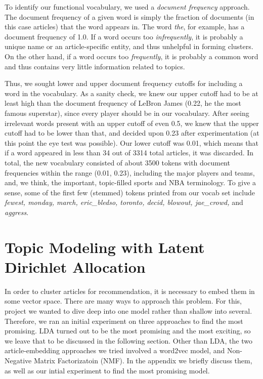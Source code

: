 \documentclass[11pt]{article}
\begin{document}
To identify our functional vocabulary, we used a \textit{document frequency} approach. The document frequency of a given word is simply the fraction of documents (in this case articles) that the word appears in. The word \textit{the}, for example, has a document frequency of 1.0. If a word occurs too \textit{infrequently}, it is probably a unique name or an article-specific entity, and thus unhelpful in forming clusters. On the other hand, if a word occurs too \textit{frequently}, it is probably a common word and thus contains very little information related to topics.

Thus, we sought lower and upper document frequency cutoffs for including a word in the vocabulary.  As a sanity check, we knew our upper cutoff had to be at least high than the document frequency of LeBron James (0.22, he the most famous superstar), since every player should be in our vocabulary. After seeing irrelevant words present with an upper cutoff of even 0.5, we knew that the upper cutoff had to be lower than that, and decided upon 0.23 after experimentation (at this point the eye test was possible). Our lower cutoff was 0.01, which means that if a word appeared in less than 34 out of 3314 total articles, it was discarded.  In total, the new vocabulary consisted of about 3500 tokens with document frequencies within the range (0.01, 0.23), including the major players and teams, and, we think, the important, topic-filled sports and NBA terminology. To give a sense, some of the first few (stemmed) tokens printed from our vocab set include \textit{fewest, monday, march, eric\_bledso, toronto, decid, blowout, jae\_crowd,} and \textit{aggress}.  

\section{Topic Modeling with Latent Dirichlet Allocation}
In order to cluster articles for recommendation, it is necessary to embed them in some vector space.  There are many ways to approach this problem.  For this, project we wanted to dive deep into one model rather than shallow into several.  Therefore, we ran an initial experiment on three approaches to find the most promising.  LDA turned out to be the most promising and the most exciting, so we leave that to be discussed in the following section.  Other than LDA, the two article-embedding approaches we tried involved a word2vec model, and Non-Negative Matrix Factorizatoin (NMF).  In the appendix we briefly discuss them, as well as our intial experiment to find the most promising model.
\end{document}
